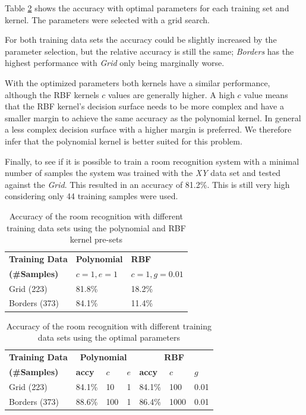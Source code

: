Table \ref{tab:SVMconfigurationPoly} shows the accuracy with optimal parameters for each training set and kernel. The parameters were selected with a grid search.

For both training data sets the accuracy could be slightly increased by the parameter selection, but the relative accuracy is still the same; \emph{Borders} has the highest performance with \emph{Grid} only being marginally worse.

With the optimized parameters both kernels have a similar performance, although the RBF kernels $c$ values are generally higher. A high $c$ value means that the RBF kernel's decision surface needs to be more complex and have a smaller margin to achieve the same accuracy as the polynomial kernel. In general a less complex decision surface with a higher margin is preferred. We therefore infer that the polynomial kernel is better suited for this problem.

Finally, to see if it is possible to train a room recognition system with a minimal number of samples the system was trained with the \emph{XY} data set and tested against the \emph{Grid}. This resulted in an accuracy of 81.2\%. This is still very high considering only 44 training samples were used.



\begin{table}

\centering
\begin{tabular}{l l l}
\toprule
\textbf{Training Data}&\textbf{Polynomial}&\textbf{RBF}\\
\textbf{(\#Samples)}&$c=1,e=1$&$c=1,g=0.01$\\
\midrule
Grid (223)&81.8\%&18.2\%\\
Borders (373)&84.1\%&11.4\%\\
\bottomrule
\end{tabular}
\caption[Room recognition - SVM pre-sets]{Accuracy of the room recognition with different training data sets using the polynomial and RBF kernel pre-sets}
\label{tab:SVMconfigurationPresets}
\end{table}

\begin{table}
\centering
\begin{tabular}{l l l l l l l}
\toprule
\textbf{Training Data}&\multicolumn{3}{c}{\textbf{Polynomial}}&\multicolumn{3}{c}{\textbf{RBF}}\\
\textbf{(\#Samples)}&\textbf{accy}&$c$&$e$&\textbf{accy}&$c$&$g$\\
\midrule
Grid (223)&84.1\%&10&1&84.1\%&100&0.01\\
Borders (373)&88.6\%&100&1&86.4\%&1000&0.01\\
\bottomrule
\end{tabular}
\caption[Room Recognition - optimized parameters]{Accuracy of the room recognition with different training data sets using the optimal parameters}
\label{tab:SVMconfigurationPoly}
\end{table}

